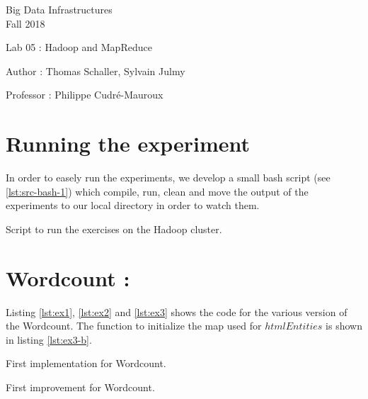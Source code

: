 \documentclass[a4paper,11pt]{report}
\date{\today}
\begin{document}
\begin{center}
\Large{
    Big Data Infrastructures\\
    Fall 2018
  }
  
  \noindent\makebox[\linewidth]{\rule{\linewidth}{0.4pt}}
  Lab 05 : Hadoop and MapReduce

  \vspace*{1.4cm}

  Author : Thomas Schaller, Sylvain Julmy
  \noindent\makebox[\linewidth]{\rule{\linewidth}{0.4pt}}

  \begin{flushleft}
    Professor : Philippe Cudré-Mauroux
  \end{flushleft}

  \noindent\makebox[\linewidth]{\rule{\textwidth}{1pt}}
\end{center}

\section*{Running the experiment}

In order to easely run the experiments, we develop a small bash script (see
\ref{lst:src-bash-1}) which compile, run, clean and move the output of the
experiments to our local directory in order to watch them.

\begin{listing}[ht]
\centering
{}
\caption{Script to run the exercises on the Hadoop cluster.}
\label{lst:scr-bash-1}
\end{listing}

\section*{Wordcount : }

Listing \ref{lst:ex1}, \ref{lst:ex2} and \ref{lst:ex3} shows the code for the
various version of the Wordcount.  The function to initialize the map used for
$htmlEntities$ is shown in listing \ref{lst:ex3-b}.

\begin{listing}[ht]
\centering
{}
\caption{First implementation for Wordcount.}
\label{lst:ex1}
\end{listing}

\begin{listing}[ht]
\centering
{}
\caption{First improvement for Wordcount.}
\label{lst:ex2}
\end{listing}
\end{document}
